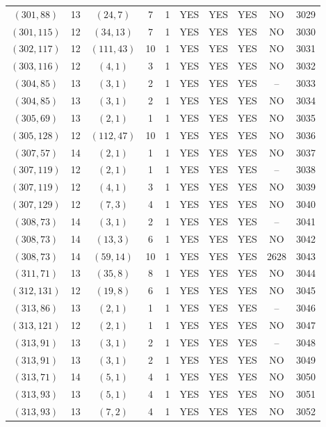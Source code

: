 \begin{longtable}{|c|c|c|c|c|c|c|c|c|c|}
$(301, 88)$ & 13 & $(24, 7)$ & 7 & 1 & YES & YES & YES & NO & 3029\\
$(301, 115)$ & 12 & $(34, 13)$ & 7 & 1 & YES & YES & YES & NO & 3030\\
$(302, 117)$ & 12 & $(111, 43)$ & 10 & 1 & YES & YES & YES & NO & 3031\\
$(303, 116)$ & 12 & $(4, 1)$ & 3 & 1 & YES & YES & YES & NO & 3032\\
$(304, 85)$ & 13 & $(3, 1)$ & 2 & 1 & YES & YES & YES & -- & 3033\\
$(304, 85)$ & 13 & $(3, 1)$ & 2 & 1 & YES & YES & YES & NO & 3034\\
$(305, 69)$ & 13 & $(2, 1)$ & 1 & 1 & YES & YES & YES & NO & 3035\\
$(305, 128)$ & 12 & $(112, 47)$ & 10 & 1 & YES & YES & YES & NO & 3036\\
$(307, 57)$ & 14 & $(2, 1)$ & 1 & 1 & YES & YES & YES & NO & 3037\\
$(307, 119)$ & 12 & $(2, 1)$ & 1 & 1 & YES & YES & YES & -- & 3038\\
$(307, 119)$ & 12 & $(4, 1)$ & 3 & 1 & YES & YES & YES & NO & 3039\\
$(307, 129)$ & 12 & $(7, 3)$ & 4 & 1 & YES & YES & YES & NO & 3040\\
$(308, 73)$ & 14 & $(3, 1)$ & 2 & 1 & YES & YES & YES & -- & 3041\\
$(308, 73)$ & 14 & $(13, 3)$ & 6 & 1 & YES & YES & YES & NO & 3042\\
$(308, 73)$ & 14 & $(59, 14)$ & 10 & 1 & YES & YES & YES & 2628 & 3043\\
$(311, 71)$ & 13 & $(35, 8)$ & 8 & 1 & YES & YES & YES & NO & 3044\\
$(312, 131)$ & 12 & $(19, 8)$ & 6 & 1 & YES & YES & YES & NO & 3045\\
$(313, 86)$ & 13 & $(2, 1)$ & 1 & 1 & YES & YES & YES & -- & 3046\\
$(313, 121)$ & 12 & $(2, 1)$ & 1 & 1 & YES & YES & YES & NO & 3047\\
$(313, 91)$ & 13 & $(3, 1)$ & 2 & 1 & YES & YES & YES & -- & 3048\\
$(313, 91)$ & 13 & $(3, 1)$ & 2 & 1 & YES & YES & YES & NO & 3049\\
$(313, 71)$ & 14 & $(5, 1)$ & 4 & 1 & YES & YES & YES & NO & 3050\\
$(313, 93)$ & 13 & $(5, 1)$ & 4 & 1 & YES & YES & YES & NO & 3051\\
$(313, 93)$ & 13 & $(7, 2)$ & 4 & 1 & YES & YES & YES & NO & 3052\\

\end{longtable}
